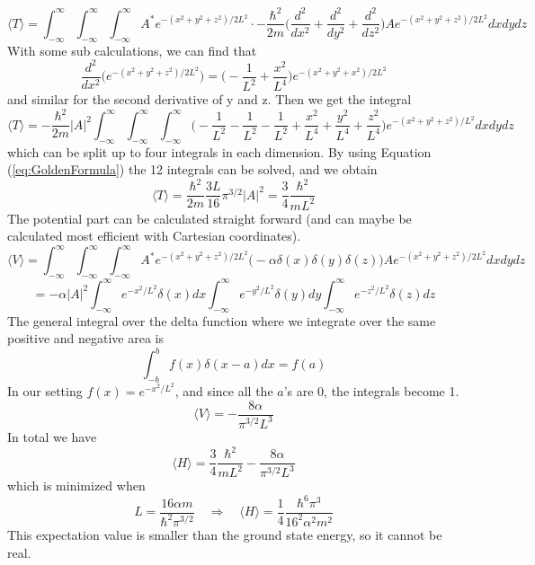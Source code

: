 \documentclass{scrartcl}
\begin{document}
\begin{equation*}
\langle T\rangle=\int_{-\infty}^{\infty}\int_{-\infty}^{\infty}\int_{-\infty}^{\infty} A^*e^{-(x^2+y^2+z^2)/2L^2}\cdot-\frac{\hbar^2}{2m}\bigg(\frac{d^2}{dx^2}+\frac{d^2}{dy^2}+\frac{d^2}{dz^2}\bigg)Ae^{-(x^2+y^2+z^2)/2L^2}dxdydz
\end{equation*}
With some sub calculations, we can find that 
\begin{equation*}
\frac{d^2}{dx^2}\Big(e^{-(x^2+y^2+z^2)/2L^2}\Big)=\bigg(-\frac{1}{L^2}+\frac{x^2}{L^4}\bigg)e^{-(x^2+y^2+x^2)/2L^2}
\end{equation*}
and similar for the second derivative of y and z. Then we get the integral
\begin{equation*}
\langle T\rangle = -\frac{\hbar^2}{2m}|A|^2\int_{-\infty}^{\infty}\int_{-\infty}^{\infty}\int_{-\infty}^{\infty}\bigg(-\frac{1}{L^2}-\frac{1}{L^2}-\frac{1}{L^2}+\frac{x^2}{L^4}+\frac{y^2}{L^4}+\frac{z^2}{L^4}\bigg)e^{-(x^2+y^2+z^2)/L^2}dxdydz
\end{equation*}
which can be split up to four integrals in each dimension. By using Equation (\ref{eq:GoldenFormula}) the 12 integrals can be solved, and we obtain
\begin{equation}
\langle T\rangle = \frac{\hbar^2}{2m}\frac{3L}{16}\pi^{3/2}|A|^2=\frac{3}{4}\frac{\hbar^2}{mL^2}
\end{equation}
The potential part can be calculated straight forward (and can maybe be calculated most efficient with Cartesian coordinates). 
\begin{equation*}
\langle V\rangle = \int_{-\infty}^{\infty}\int_{-\infty}^{\infty}\int_{-\infty}^{\infty}A^*e^{-(x^2+y^2+z^2)/2L^2} \Big(-\alpha\delta(x)\delta(y)\delta(z)\Big)Ae^{-(x^2+y^2+z^2)/2L^2} dxdydz
\end{equation*}
\begin{equation*}
=-\alpha|A|^2\int_{-\infty}^{\infty}e^{-x^2/L^2}\delta(x)dx \int_{-\infty}^{\infty}e^{-y^2/L^2}\delta(y)dy \int_{-\infty}^{\infty}e^{-z^2/L^2}\delta(z)dz
\end{equation*}
The general integral over the delta function where we integrate over the same positive and negative area is
\begin{equation}
\int_{-b}^bf(x)\delta(x-a)dx=f(a)
\end{equation}
In our setting $f(x)=e^{-x^2/L^2}$, and since all the $a$'s are 0, the integrals become 1. 
\begin{equation}
\langle V\rangle = -\frac{8\alpha}{\pi^{3/2}L^3}
\end{equation}
In total we have 
\begin{equation}
\langle H\rangle = \frac{3}{4}\frac{\hbar^2}{mL^2}-\frac{8\alpha}{\pi^{3/2}L^3}
\end{equation}
which is minimized when
\begin{equation}
L=\frac{16\alpha m}{\hbar^2\pi^{3/2}}\quad\Rightarrow\quad\langle H\rangle = \frac{1}{4}\frac{\hbar^6\pi^3}{16^2\alpha^2m^2}
\end{equation}
This expectation value is smaller than the ground state energy, so it cannot be real.
\end{document}
